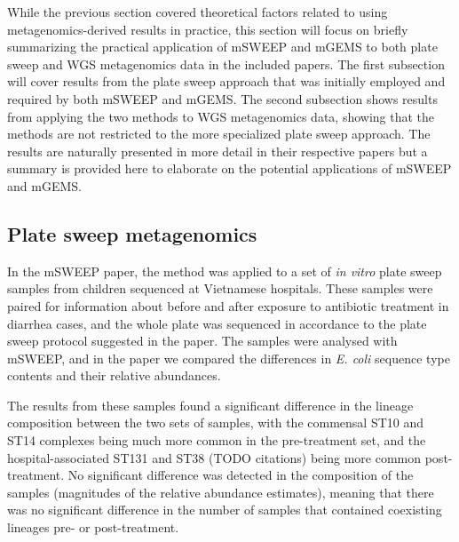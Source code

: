 \documentclass[officiallayout]{tktla}
\begin{document}
While the previous section covered theoretical factors related to
using metagenomics-derived results in practice, this section will
focus on briefly summarizing the practical application of mSWEEP and
mGEMS to both plate sweep and WGS metagenomics data in the included
papers. The first subsection will cover results from the plate sweep
approach that was initially employed and required by both mSWEEP and
mGEMS. The second subsection shows results from applying the two
methods to WGS metagenomics data, showing that the methods are not
restricted to the more specialized plate sweep approach. The results
are naturally presented in more detail in their respective papers but
a summary is provided here to elaborate on the potential applications
of mSWEEP and mGEMS.

\subsection{Plate sweep metagenomics}

In the mSWEEP paper, the method was applied to a set of \textit{in
  vitro} plate sweep samples from children sequenced at Vietnamese
hospitals. These samples were paired for information about before and
after exposure to antibiotic treatment in diarrhea cases, and the
whole plate was sequenced in accordance to the plate sweep protocol
suggested in the paper. The samples were analysed with mSWEEP, and in
the paper we compared the differences in \textit{E. coli} sequence
type contents and their relative abundances.

The results from these samples found a significant difference in the
lineage composition between the two sets of samples, with the
commensal ST10 and ST14 complexes being much more common in the
pre-treatment set, and the hospital-associated ST131 and ST38 (TODO
citations) being more common post-treatment. No significant difference
was detected in the composition of the samples (magnitudes of the
relative abundance estimates), meaning that there was no significant difference in
the number of samples that contained coexisting lineages pre- or post-treatment.
\end{document}
